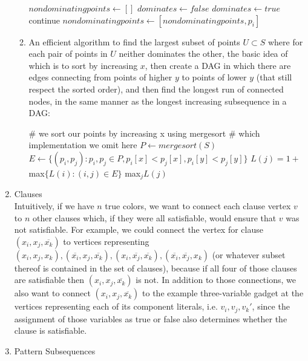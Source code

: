 \documentclass[a4paper]{article}
\begin{document}
\begin{enumerate}
\begin{enumerate}
		\begin{algorithmic}
		\State $nondominatingpoints \gets []$
			\State $dominates \gets false$
					\State $dominates \gets true$
				\EndIf
			\EndFor
				\State continue
			\EndIf
			\State $nondominatingpoints \gets [nondominatingpoints, p_i]$
		\EndFor
		\end{algorithmic}
	\item An efficient algorithm to find the largest subset of points $U \subset S$ where for each pair of points in $U$ neither dominates the other, the basic idea of which is to sort by increasing $x$, then create a DAG in which there are edges connecting from points of higher $y$ to points of lower $y$ (that still respect the sorted order), and then find the longest run of connected nodes, in the same manner as the longest increasing subsequence in a DAG:
		\begin{algorithmic}
		\State \# we sort our points by increasing x using mergesort
		\State \# which implementation we omit here
		\State $P \gets mergesort(S)$
		\State $E \gets \{(p_i, p_j): p_i, p_j \in P, p_i[x] < p_j[x], p_i[y] < p_j[y]\}$
		\For{$j = 1, 2, ..., n:$}
			\State $L(j) = 1 + $max$\{L(i) : (i, j) \in E\}$
		\EndFor
		\State \Return max$_j L(j)$
		\end{algorithmic}
	\end{enumerate}
\item Clauses\\
	 Intuitively, if we have $n$ true colors, we want to connect each clause vertex $v$ to $n$ other clauses which, if they were all satisfiable, would ensure that $v$ was not satisfiable.  For example, we could connect the vertex for clause $(x_i, x_j, \overline{x_k})$ to vertices representing $(x_i, x_j, x_k), (\overline{x_i}, x_j, \overline{x_k}), (x_i, \overline{x_j}, \overline{x_k}), (\overline{x_i}, \overline{x_j}, x_k)$ (or whatever subset thereof is contained in the set of clauses), because if all four of those clauses are satisfiable then $(x_i, x_j, \overline{x_k})$ is not.  In addition to those connections, we also want to connect $(x_i, x_j, \overline{x_k})$ to the example three-variable gadget at the vertices representing each of its component literals, i.e. $v_i, v_j, v_k '$, since the assignment of those variables as true or false also determines whether the clause is satisfiable.
\item Pattern Subsequences
	\begin{enumerate}

\end{enumerate}
\end{enumerate}
\end{document}
